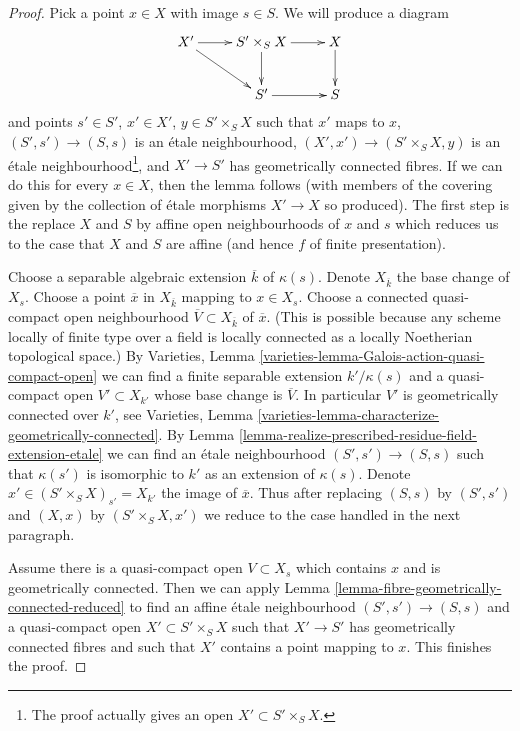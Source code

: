 \documentclass[10pt,a4paper]{amsart}
\theoremstyle{plain}
\theoremstyle{definition}
\theoremstyle{remark}
\numberwithin{equation}{subsection}
\begin{document}
\begin{proof}
Pick a point $x \in X$ with image $s \in S$. We will produce
a diagram
$$
\xymatrix{
X' \ar[r] \ar[rd] & S' \times_S X \ar[r] \ar[d] & X \ar[d] \\
& S' \ar[r] & S
}
$$
and points $s' \in S'$, $x' \in X'$, $y \in S' \times_S X$
such that $x'$ maps to $x$, $(S', s') \to (S, s)$
is an \'etale neighbourhood, $(X', x') \to (S' \times_S X, y)$
is an \'etale neighbourhood\footnote{The proof actually gives
an open $X' \subset S' \times_S X$.}, and
$X' \to S'$ has geometrically
connected fibres. If we can do this for every $x \in X$, then
the lemma follows (with members of the covering given by the
collection of \'etale morphisms $X' \to X$ so produced).
The first step is the replace $X$ and $S$ by affine open neighbourhoods
of $x$ and $s$ which reduces us to the case that $X$ and $S$ are affine
(and hence $f$ of finite presentation).

\medskip\noindent
Choose a separable algebraic extension $\overline{k}$ of $\kappa(s)$.
Denote $X_{\overline{k}}$ the base change of $X_s$.
Choose a point $\overline{x}$ in $X_{\overline{k}}$ mapping to $x \in X_s$.
Choose a connected quasi-compact open neighbourhood
$\overline{V} \subset X_{\overline{k}}$
of $\overline{x}$. (This is possible because any scheme
locally of finite type over a field is locally connected
as a locally Noetherian topological space.)
By Varieties, Lemma \ref{varieties-lemma-Galois-action-quasi-compact-open}
we can find a finite separable extension $k'/\kappa(s)$
and a quasi-compact open $V' \subset X_{k'}$ whose
base change is $\overline{V}$. In particular $V'$ is
geometrically connected over $k'$, see
Varieties, Lemma \ref{varieties-lemma-characterize-geometrically-connected}. By
Lemma \ref{lemma-realize-prescribed-residue-field-extension-etale}
we can find an \'etale neighbourhood $(S', s') \to (S, s)$
such that $\kappa(s')$ is isomorphic to $k'$ as an extension
of $\kappa(s)$.
Denote $x' \in (S' \times_S X)_{s'} = X_{k'}$ the image of $\overline{x}$.
Thus after replacing $(S, s)$ by $(S', s')$ and $(X, x)$ by
$(S' \times_S X, x')$ we reduce to the case handled in the next
paragraph.

\medskip\noindent
Assume there is a quasi-compact open $V \subset X_s$
which contains $x$ and is geometrically connected.
Then we can apply Lemma \ref{lemma-fibre-geometrically-connected-reduced}
to find an affine \'etale neighbourhood $(S', s') \to (S, s)$
and a quasi-compact open $X' \subset S' \times_S X$ such that
$X' \to S'$ has geometrically connected fibres
and such that $X'$ contains a point mapping to $x$.
This finishes the proof.
\end{proof}
\end{document}
